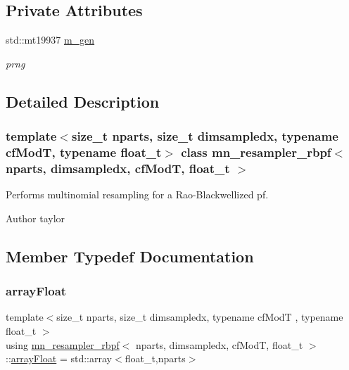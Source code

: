 \subsection*{Private Attributes}
\begin{DoxyCompactItemize}
\item 
\mbox{\label{classmn__resampler__rbpf_ad4ff62e53d193d9126889a59c54a4d0e}} 
std\+::mt19937 \hyperlink{classmn__resampler__rbpf_ad4ff62e53d193d9126889a59c54a4d0e}{m\+\_\+gen}
\begin{DoxyCompactList}\small\item\em prng \end{DoxyCompactList}\end{DoxyCompactItemize}


\subsection{Detailed Description}
\subsubsection*{template$<$size\+\_\+t nparts, size\+\_\+t dimsampledx, typename cf\+ModT, typename float\+\_\+t$>$\newline
class mn\+\_\+resampler\+\_\+rbpf$<$ nparts, dimsampledx, cf\+Mod\+T, float\+\_\+t $>$}

Performs multinomial resampling for a Rao-\/\+Blackwellized pf. 

\begin{DoxyAuthor}{Author}
taylor 
\end{DoxyAuthor}


\subsection{Member Typedef Documentation}
\mbox{\label{classmn__resampler__rbpf_a43fa641c6d15c8ee79da47d6af02ac16}} 
\subsubsection{\texorpdfstring{array\+Float}{arrayFloat}}
{\footnotesize\ttfamily template$<$size\+\_\+t nparts, size\+\_\+t dimsampledx, typename cf\+ModT , typename float\+\_\+t $>$ \\
using \hyperlink{classmn__resampler__rbpf}{mn\+\_\+resampler\+\_\+rbpf}$<$ nparts, dimsampledx, cf\+ModT, float\+\_\+t $>$\+::\hyperlink{classmn__resampler__rbpf_a43fa641c6d15c8ee79da47d6af02ac16}{array\+Float} =  std\+::array$<$float\+\_\+t,nparts$>$}

